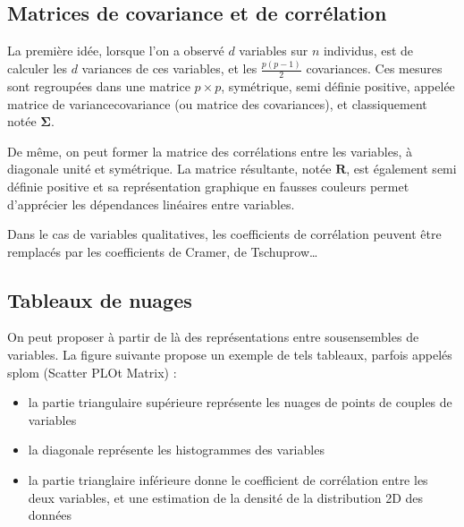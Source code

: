 \documentclass[letterpaper,10pt,french]{sphinxmanual}
\begin{document}
\subsection{Matrices de covariance et de corrélation}
\label{\detokenize{statsdescriptives:matrices-de-covariance-et-de-correlation}}
\sphinxAtStartPar
La première idée, lorsque l’on a observé \(d\) variables sur \(n\) individus, est de calculer les \(d\) variances de ces variables, et les \(\frac{p(p-1)}{2}\) covariances. Ces mesures sont regroupées dans une matrice \(p\times p\), symétrique, semi définie positive, appelée matrice de variance\sphinxhyphen{}covariance (ou matrice des covariances), et classiquement notée \(\boldsymbol\Sigma\).

\sphinxAtStartPar
De même, on peut former la matrice des corrélations entre les variables, à diagonale unité et symétrique. La matrice résultante, notée \(\mathbf R\), est également semi définie positive et sa représentation graphique en fausses couleurs permet d’apprécier les dépendances linéaires entre variables.

\sphinxAtStartPar
{}

\sphinxAtStartPar
Dans le cas de variables qualitatives, les coefficients de corrélation peuvent être remplacés par les coefficients de Cramer, de Tschuprow…


\subsection{Tableaux de nuages}
\label{\detokenize{statsdescriptives:tableaux-de-nuages}}
\sphinxAtStartPar
On peut proposer à partir de là des représentations entre sous\sphinxhyphen{}ensembles de variables. La figure suivante propose un exemple de tels tableaux, parfois appelés splom (Scatter PLOt Matrix) :
\begin{itemize}
\item {} 
\sphinxAtStartPar
la partie triangulaire supérieure représente les nuages de points de couples de variables

\item {} 
\sphinxAtStartPar
la diagonale représente les histogrammes des variables

\item {} 
\sphinxAtStartPar
la partie trianglaire inférieure donne le coefficient de corrélation entre les deux variables, et une estimation de la densité de la distribution 2D des données

\end{itemize}
\end{document}
